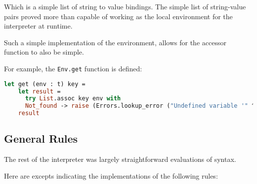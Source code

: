 \documentclass{l4proj}
\begin{document}
Which is a simple list of string to value bindings.
The simple list of string-value pairs proved more than capable of working as the local environment for the interpreter at runtime.

Such a simple implementation of the environment, allows for the accessor function to also be simple.

For example, the \texttt{Env.get} function is defined:

\begin{lstlisting}[language=Caml, caption=PyFunc's Interpreter Environment get function.]
    let get (env : t) key =
    let result = 
      try List.assoc key env with 
      Not_found -> raise (Errors.lookup_error ("Undefined variable '" ^ key ^ "'!")) in
    result
\end{lstlisting}






\subsection{General Rules}
The rest of the interpreter was largely straightforward evaluations of syntax.

Here are excepts indicating the implementations of the following rules:
\end{document}

